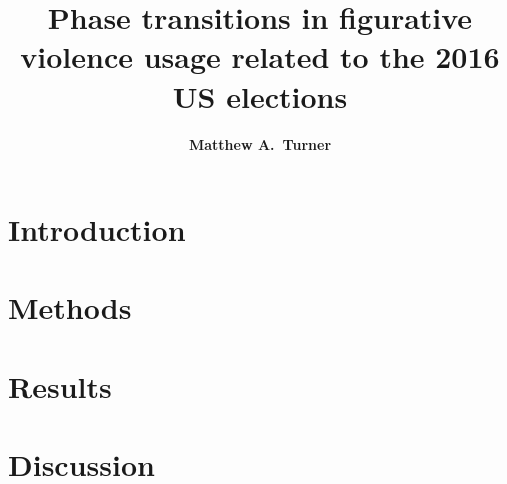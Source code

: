 \documentclass[11pt,letterpaper]{article}
\title{Phase transitions in figurative violence usage related to the 2016 US elections}
\author{{\large \bf Matthew A.~Turner}}
\begin{document}
\maketitle


% 

\section{Introduction}


\section{Methods}
\label{sec:Methods}


\section{Results}
\label{sec:Results}


\section{Discussion}





\setlength{\bibleftmargin}{.125in}
\setlength{\bibindent}{-\bibleftmargin}


\end{document}
